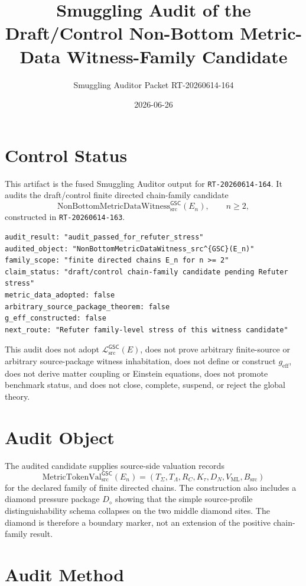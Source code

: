 \documentclass[11pt]{article}
\title{Smuggling Audit of the Draft/Control Non-Bottom Metric-Data Witness-Family Candidate}
\author{Smuggling Auditor Packet RT-20260614-164}
\date{2026-06-26}
\newcommand{\MetricTokenVal}{\mathrm{MetricTokenVal}_{\mathrm{src}}^{\mathsf{GSC}}}
\newcommand{\Witness}{\mathrm{NonBottomMetricDataWitness}_{\mathrm{src}}^{\mathsf{GSC}}}
\newcommand{\MetricData}{\mathcal{L}_{\mathrm{src}}^{\mathsf{GSC}}}
\newcommand{\geff}{g_{\mathrm{eff}}}
\newcommand{\En}{E_n}
\newcommand{\Ddiamond}{D_{\diamond}}
\begin{document}
\maketitle

\section{Control Status}

This artifact is the fused Smuggling Auditor output for
\texttt{RT-20260614-164}. It audits the draft/control finite directed
chain-family candidate
\[
  \Witness(\En),\qquad n\ge 2,
\]
constructed in \texttt{RT-20260614-163}.

\begin{verbatim}
audit_result: "audit_passed_for_refuter_stress"
audited_object: "NonBottomMetricDataWitness_src^{GSC}(E_n)"
family_scope: "finite directed chains E_n for n >= 2"
claim_status: "draft/control chain-family candidate pending Refuter stress"
metric_data_adopted: false
arbitrary_source_package_theorem: false
g_eff_constructed: false
next_route: "Refuter family-level stress of this witness candidate"
\end{verbatim}

This audit does not adopt \(\MetricData(E)\), does not prove arbitrary
finite-source or arbitrary source-package witness inhabitation, does not
define or construct \(\geff\), does not derive matter coupling or Einstein
equations, does not promote benchmark status, and does not close, complete,
suspend, or reject the global theory.

\section{Audit Object}

The audited candidate supplies source-side valuation records
\[
  \MetricTokenVal(\En)=
  (T_{\Sigma},T_{\Lambda},R_C,K_{\tau},D_N,V_{\mathrm{ML}},B_{\mathrm{src}})
\]
for the declared family of finite directed chains. The construction also
includes a diamond pressure package \(\Ddiamond\) showing that the simple
source-profile distinguishability schema collapses on the two middle diamond
sites. The diamond is therefore a boundary marker, not an extension of the
positive chain-family result.

\section{Audit Method}
\end{document}
